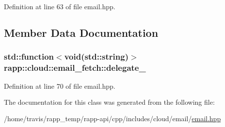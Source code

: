 Definition at line 63 of file email.\-hpp.



\subsection{Member Data Documentation}
\hypertarget{classrapp_1_1cloud_1_1email__fetch_a1eb39614f4591489d29874dfa9b0bcda}{
\subsubsection[{delegate\-\_\-}]{\setlength{\rightskip}{0pt plus 5cm}std\-::function$<$void(std\-::string)$>$ rapp\-::cloud\-::email\-\_\-fetch\-::delegate\-\_\-\hspace{0.3cm}{\ttfamily [private]}}}\label{classrapp_1_1cloud_1_1email__fetch_a1eb39614f4591489d29874dfa9b0bcda}


Definition at line 70 of file email.\-hpp.



The documentation for this class was generated from the following file\-:\begin{DoxyCompactItemize}
\item 
/home/travis/rapp\-\_\-temp/rapp-\/api/cpp/includes/cloud/email/\hyperlink{email_8hpp}{email.\-hpp}\end{DoxyCompactItemize}
